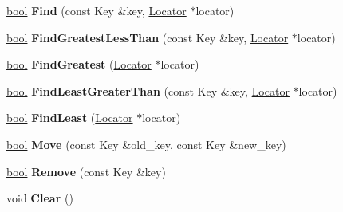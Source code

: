 \begin{DoxyCompactItemize}
\mbox{\hyperlink{classbool}{bool}} {\bfseries Find} (const Key \&key, \mbox{\hyperlink{classv8_1_1internal_1_1SplayTree_1_1Locator}{Locator}} $\ast$locator)
\item 
\mbox{\label{classv8_1_1internal_1_1SplayTree_a1017cfc30654ba532f6039eff73de8c8}} 
\mbox{\hyperlink{classbool}{bool}} {\bfseries Find\+Greatest\+Less\+Than} (const Key \&key, \mbox{\hyperlink{classv8_1_1internal_1_1SplayTree_1_1Locator}{Locator}} $\ast$locator)
\item 
\mbox{\label{classv8_1_1internal_1_1SplayTree_aa9c4bffb3e15a22809a9014f374530e1}} 
\mbox{\hyperlink{classbool}{bool}} {\bfseries Find\+Greatest} (\mbox{\hyperlink{classv8_1_1internal_1_1SplayTree_1_1Locator}{Locator}} $\ast$locator)
\item 
\mbox{\label{classv8_1_1internal_1_1SplayTree_a95fb504c2fa06a211446d983e689e944}} 
\mbox{\hyperlink{classbool}{bool}} {\bfseries Find\+Least\+Greater\+Than} (const Key \&key, \mbox{\hyperlink{classv8_1_1internal_1_1SplayTree_1_1Locator}{Locator}} $\ast$locator)
\item 
\mbox{\label{classv8_1_1internal_1_1SplayTree_a1379eb90062c1a6b9e7173792d651e86}} 
\mbox{\hyperlink{classbool}{bool}} {\bfseries Find\+Least} (\mbox{\hyperlink{classv8_1_1internal_1_1SplayTree_1_1Locator}{Locator}} $\ast$locator)
\item 
\mbox{\label{classv8_1_1internal_1_1SplayTree_a401e85c47e6fc90f75ac37220d2a4bc2}} 
\mbox{\hyperlink{classbool}{bool}} {\bfseries Move} (const Key \&old\+\_\+key, const Key \&new\+\_\+key)
\item 
\mbox{\label{classv8_1_1internal_1_1SplayTree_a193702074e0c336766c28e68a8355c34}} 
\mbox{\hyperlink{classbool}{bool}} {\bfseries Remove} (const Key \&key)
\item 
\mbox{\label{classv8_1_1internal_1_1SplayTree_a1ff226e5ca35dc162b0c5f878a7e6d8f}} 
void {\bfseries Clear} ()
\item 
\mbox{\label{classv8_1_1internal_1_1SplayTree_ad2d753c67a570c9d879fbf958b89feaa}} 

\end{DoxyCompactItemize}
